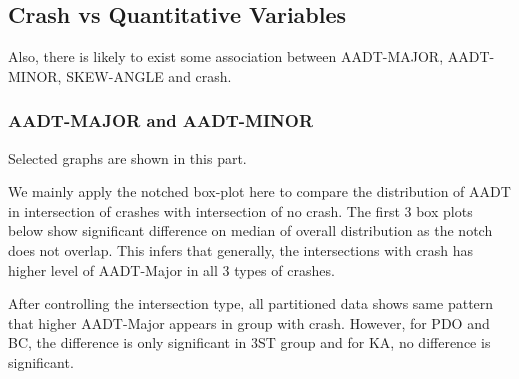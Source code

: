 \documentclass[11pt]{scrartcl} %
\begin{document}
\subsection{Crash vs Quantitative Variables}

Also, there is likely to exist some association between AADT-MAJOR, AADT-MINOR, SKEW-ANGLE and crash.

\subsubsection{AADT-MAJOR and AADT-MINOR}

Selected graphs are shown in this part.

We mainly apply the notched box-plot here to compare the distribution of AADT in intersection of crashes with intersection of no crash. The first 3 box plots below show significant difference on median of overall distribution as the notch does not overlap. This infers that generally, the intersections with crash has higher level of AADT-Major in all 3 types of crashes.

After controlling the intersection type, all partitioned data shows same pattern that higher AADT-Major appears in group with crash. However, for PDO and BC, the difference is only significant in 3ST group and for KA, no difference is significant.
\end{document}
